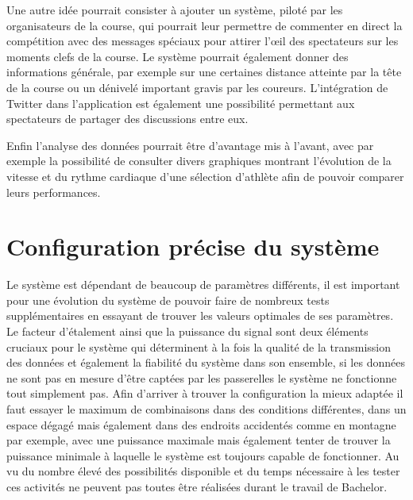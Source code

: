 Une autre idée pourrait consister à ajouter un système, piloté par les organisateurs de la course, qui pourrait leur permettre de commenter en direct la compétition avec des messages spéciaux pour attirer l'œil des spectateurs sur les moments clefs de la course. Le système pourrait également donner des informations générale, par exemple sur une certaines distance atteinte par la tête de la course ou un dénivelé important gravis par les coureurs. L'intégration de Twitter dans l'application est également une possibilité permettant aux spectateurs de partager des discussions entre eux.

Enfin l'analyse des données pourrait être d'avantage mis à l'avant, avec par exemple la possibilité de consulter divers graphiques montrant l'évolution de la vitesse et du rythme cardiaque d'une sélection d'athlète afin de pouvoir comparer leurs performances.

\section{Configuration précise du système}

Le système est dépendant de beaucoup de paramètres différents, il est important pour une évolution du système de pouvoir faire de nombreux tests supplémentaires en essayant de trouver les valeurs optimales de ses paramètres. Le facteur d'étalement ainsi que la puissance du signal sont deux éléments cruciaux pour le système qui déterminent à la fois la qualité de la transmission des données et également la fiabilité du système dans son ensemble, si les données ne sont pas en mesure d'être captées par les passerelles le système ne fonctionne tout simplement pas. Afin d'arriver à trouver la configuration la mieux adaptée il faut essayer le maximum de combinaisons dans des conditions différentes, dans un espace dégagé mais également dans des endroits accidentés comme en montagne par exemple, avec une puissance maximale mais également tenter de trouver la puissance minimale à laquelle le système est toujours capable de fonctionner. Au vu du nombre élevé des possibilités disponible et du temps nécessaire à les tester ces activités ne peuvent pas toutes être réalisées durant le travail de Bachelor.